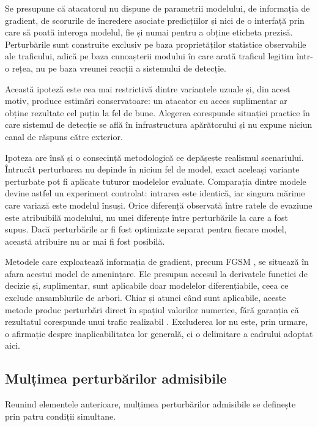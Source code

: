 Se presupune că atacatorul nu dispune de parametrii modelului, de informația de gradient, de scorurile de încredere asociate predicțiilor și nici de o interfață prin care să poată interoga modelul, fie și numai pentru a obține eticheta prezisă. Perturbările sunt construite exclusiv pe baza proprietăților statistice observabile ale traficului, adică pe baza cunoașterii modului în care arată traficul legitim într-o rețea, nu pe baza vreunei reacții a sistemului de detecție.

Această ipoteză este cea mai restrictivă dintre variantele uzuale și, din acest motiv, produce estimări conservatoare: un atacator cu acces suplimentar ar obține rezultate cel puțin la fel de bune. Alegerea corespunde situației practice în care sistemul de detecție se află în infrastructura apărătorului și nu expune niciun canal de răspuns către exterior.

Ipoteza are însă și o consecință metodologică ce depășește realismul scenariului. Întrucât perturbarea nu depinde în niciun fel de model, exact aceleași variante perturbate pot fi aplicate tuturor modelelor evaluate. Comparația dintre modele devine astfel un experiment controlat: intrarea este identică, iar singura mărime care variază este modelul însuși. Orice diferență observată între ratele de evaziune este atribuibilă modelului, nu unei diferențe între perturbările la care a fost supus. Dacă perturbările ar fi fost optimizate separat pentru fiecare model, această atribuire nu ar mai fi fost posibilă.

Metodele care exploatează informația de gradient, precum FGSM \cite{goodfellow2015explaining}, se situează în afara acestui model de amenințare. Ele presupun accesul la derivatele funcției de decizie și, suplimentar, sunt aplicabile doar modelelor diferențiabile, ceea ce exclude ansamblurile de arbori. Chiar și atunci când sunt aplicabile, aceste metode produc perturbări direct în spațiul valorilor numerice, fără garanția că rezultatul corespunde unui trafic realizabil \cite{zhang2022adversarial, he2023adversarial}. Excluderea lor nu este, prin urmare, o afirmație despre inaplicabilitatea lor generală, ci o delimitare a cadrului adoptat aici.

\subsection{Mulțimea perturbărilor admisibile}\label{subsec:admisibile}

Reunind elementele anterioare, mulțimea perturbărilor admisibile se definește prin patru condiții simultane.

